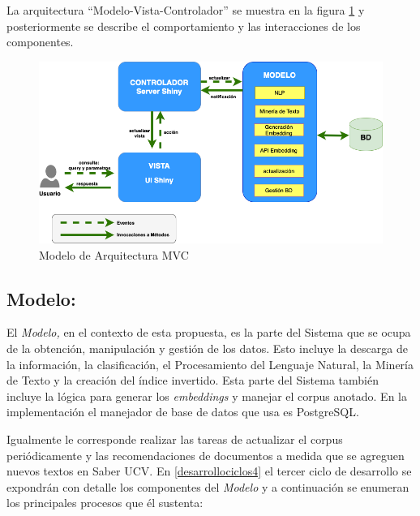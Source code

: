 \documentclass[
  12pt,
  openany]{book}
\begin{document}
La arquitectura ``Modelo-Vista-Controlador'' se muestra en la figura \ref{fig:arquitecturamvc} y posteriormente se describe el comportamiento y las interacciones de los componentes.

\begin{figure}

{\centering \includegraphics[width=0.9\linewidth]{images/05-desarrollo/MVC9} 

}

\caption{Modelo de Arquitectura MVC}\label{fig:arquitecturamvc}
\end{figure}

\hypertarget{modelo}{%
\subsection{\texorpdfstring{\textbf{Modelo:}}{Modelo:}}\label{modelo}}

El \emph{Modelo,} en el contexto de esta propuesta, es la parte del Sistema que se ocupa de la obtención, manipulación y gestión de los datos. Esto incluye la descarga de la información, la clasificación, el Procesamiento del Lenguaje Natural, la Minería de Texto y la creación del índice invertido. Esta parte del Sistema también incluye la lógica para generar los \emph{embeddings} y manejar el corpus anotado. En la implementación el manejador de base de datos que usa es PostgreSQL.

Igualmente le corresponde realizar las tareas de actualizar el corpus periódicamente y las recomendaciones de documentos a medida que se agreguen nuevos textos en Saber UCV. En \ref{desarrollociclos4} el tercer ciclo de desarrollo se expondrán con detalle los componentes del \emph{Modelo} y a continuación se enumeran los principales procesos que él sustenta:
\end{document}
